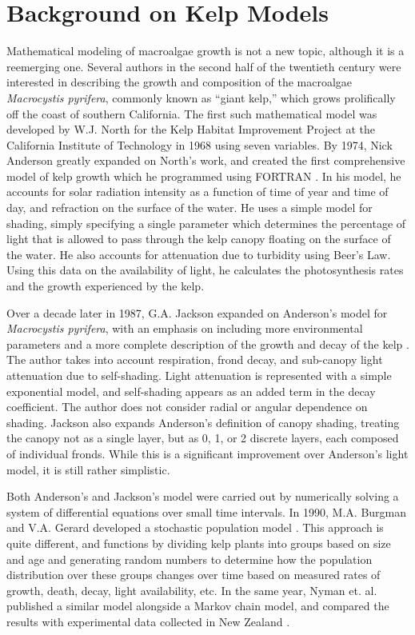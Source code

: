 \section{Background on Kelp Models}

Mathematical modeling of macroalgae growth is not a new topic, although it is a reemerging one.
Several authors in the second half of the twentieth century were interested in describing the growth and composition of the macroalgae \textit{Macrocystis pyrifera}, commonly known as ``giant kelp,'' which grows prolifically off the coast of southern California.
The first such mathematical model was developed by W.J. North for the Kelp Habitat Improvement Project at the California Institute of Technology in 1968 using seven variables.
By 1974, Nick Anderson greatly expanded on North's work, and created the first comprehensive model of kelp growth which he programmed using FORTRAN \cite{anderson_mathematical_1974}.
In his model, he accounts for solar radiation intensity as a function of time of year and time of day, and refraction on the surface of the water.
He uses a simple model for shading, simply specifying a single parameter which determines the percentage of light that is allowed to pass through the kelp canopy floating on the surface of the water.
He also accounts for attenuation due to turbidity using Beer's Law.
Using this data on the availability of light, he calculates the photosynthesis rates and the growth experienced by the kelp.

Over a decade later in 1987, G.A.
Jackson expanded on Anderson's model for \textit{Macrocystis pyrifera}, with an emphasis on including more environmental parameters and a more complete description of the growth and decay of the kelp \cite{jackson_modelling_1987}. 
The author takes into account respiration, frond decay, and sub-canopy light attenuation due to self-shading.
Light attenuation is represented with a simple exponential model, and self-shading appears as an added term in the decay coefficient.
The author does not consider radial or angular dependence on shading. %
Jackson also expands Anderson's definition of canopy shading, treating the canopy not as a single layer, but as 0, 1, or 2 discrete layers, each composed of individual fronds.
While this is a significant improvement over Anderson's light model, it is still rather simplistic.

Both Anderson's and Jackson's model were carried out by numerically solving a system of differential equations over small time intervals.
In 1990, M.A. Burgman and V.A. Gerard developed a stochastic population model \cite{burgman_stage-structured_1990}.
This approach is quite different, and functions by dividing kelp plants into groups based on size and age and generating random numbers to determine how the population distribution over these groups changes over time based on measured rates of growth, death, decay, light availability, etc.
In the same year, Nyman et. al. published a similar model alongside a Markov chain model, and compared the results with experimental data collected in New Zealand \cite{nyman_macrocystis_1990}.

